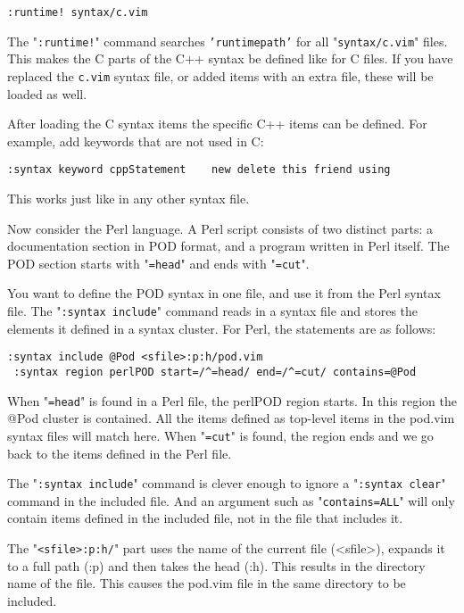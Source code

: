 \begin{Verbatim}[samepage=true]
 :runtime! syntax/c.vim
\end{Verbatim}

The "\texttt{:runtime!}" command searches \texttt{'runtimepath'} for all "\texttt{syntax/c.vim}" files.
This makes the C parts of the C++ syntax be defined like for C files.
If you have replaced the \texttt{c.vim} syntax file, or added items with an extra file, these will be loaded as well.

After loading the C syntax items the specific C++ items can be defined.
For example, add keywords that are not used in C:

\begin{Verbatim}[samepage=true]
 :syntax keyword cppStatement    new delete this friend using
\end{Verbatim}

This works just like in any other syntax file.

Now consider the Perl language.
A Perl script consists of two distinct parts: a documentation section in POD format, and a program written in Perl itself.
The POD section starts with "\texttt{=head}" and ends with "\texttt{=cut}".

You want to define the POD syntax in one file, and use it from the Perl syntax file.
The "\texttt{:syntax include}" command reads in a syntax file and stores the elements it defined in a syntax cluster.
For Perl, the statements are as follows:

\begin{Verbatim}[samepage=true]
 :syntax include @Pod <sfile>:p:h/pod.vim
 :syntax region perlPOD start=/^=head/ end=/^=cut/ contains=@Pod
\end{Verbatim}

When "\texttt{=head}" is found in a Perl file, the perlPOD region starts.
In this region the @Pod cluster is contained.
All the items defined as top-level items in the pod.vim syntax files will match here.
When "\texttt{=cut}" is found, the region ends and we go back to the items defined in the Perl file.

The "\texttt{:syntax include}" command is clever enough to ignore a "\texttt{:syntax clear}" command in the included file.
And an argument such as "\texttt{contains=ALL}" will only contain items defined in the included file, not in the file that includes it.

The "\texttt{<sfile>:p:h/}" part uses the name of the current file (<sfile>), expands it to a full path (:p) and then takes the head (:h).
This results in the directory name of the file.
This causes the pod.vim file in the same directory to be included.

